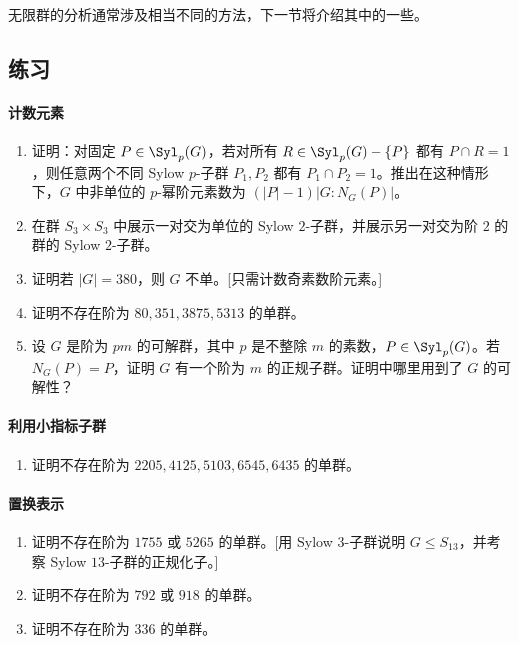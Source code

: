 无限群的分析通常涉及相当不同的方法，下一节将介绍其中的一些。

\subsection*{练习}
\paragraph{计数元素}
\begin{enumerate}[label=\arabic*.]
  \item 证明：对固定 $P\in\Syl_p(G)$，若对所有 $R\in\Syl_p(G)-\{P\}$ 都有 $P\cap R=1$，则任意两个不同 Sylow $p$-子群 $P_1,P_2$ 都有 $P_1\cap P_2=1$。推出在这种情形下，$G$ 中非单位的 $p$-幂阶元素数为 $(|P|-1)|G:N_G(P)|$。
  \item 在群 $S_3\times S_3$ 中展示一对交为单位的 Sylow $2$-子群，并展示另一对交为阶 $2$ 的群的 Sylow $2$-子群。
  \item 证明若 $|G|=380$，则 $G$ 不单。[只需计数奇素数阶元素。]
  \item 证明不存在阶为 $80,351,3875,5313$ 的单群。
  \item 设 $G$ 是阶为 $pm$ 的可解群，其中 $p$ 是不整除 $m$ 的素数，$P\in\Syl_p(G)$。若 $N_G(P)=P$，证明 $G$ 有一个阶为 $m$ 的正规子群。证明中哪里用到了 $G$ 的可解性？
\end{enumerate}

\paragraph{利用小指标子群}
\begin{enumerate}[label=\arabic*.,resume]
  \item 证明不存在阶为 $2205,4125,5103,6545,6435$ 的单群。
\end{enumerate}

\paragraph{置换表示}
\begin{enumerate}[label=\arabic*.,resume]
  \item 证明不存在阶为 $1755$ 或 $5265$ 的单群。[用 Sylow $3$-子群说明 $G\leq S_{13}$，并考察 Sylow $13$-子群的正规化子。]
  \item 证明不存在阶为 $792$ 或 $918$ 的单群。
  \item 证明不存在阶为 $336$ 的单群。
\end{enumerate}

